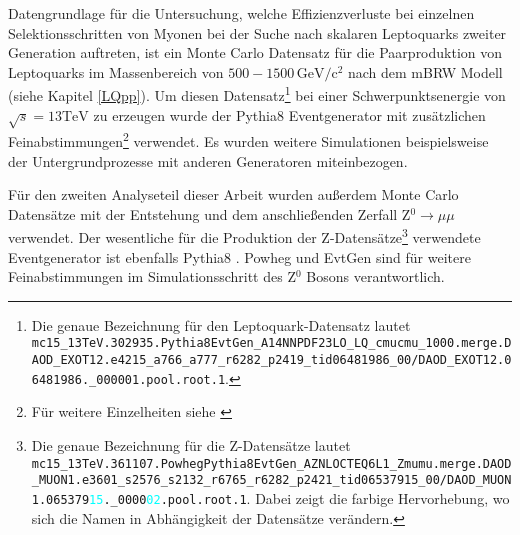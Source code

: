 Datengrundlage für die Untersuchung, welche Effizienzverluste bei einzelnen Selektionsschritten von Myonen bei der Suche nach skalaren Leptoquarks zweiter Generation auftreten, ist ein Monte Carlo Datensatz für die Paarproduktion von Leptoquarks im Massenbereich von $500-1500\,\text{GeV}/\text{c}^2$ nach dem mBRW Modell (siehe Kapitel \ref{LQpp}). Um diesen Datensatz\footnote{Die genaue Bezeichnung für den Leptoquark-Datensatz lautet \nolinkurl{mc15_13TeV.302935.Pythia8EvtGen_A14NNPDF23LO_LQ_cmucmu_1000.merge.DAOD_EXOT12.e4215_a766_a777_r6282_p2419_tid06481986_00/DAOD_EXOT12.06481986._000001.pool.root.1}.} bei einer Schwerpunktsenergie von $\sqrt{s}=13\text{TeV}$ zu erzeugen wurde der Pythia8 Eventgenerator \cite{Pythia8} mit zusätzlichen Feinabstimmungen\footnote{Für weitere Einzelheiten siehe \cite{LQATLAS}} verwendet. Es wurden weitere Simulationen beispielsweise der Untergrundprozesse mit anderen Generatoren miteinbezogen. %

Für den zweiten Analyseteil dieser Arbeit wurden außerdem Monte Carlo Datensätze mit der Entstehung und dem anschließenden  Zerfall Z$^0\rightarrow\mu\mu$ verwendet. Der wesentliche für die Produktion der Z-Datensätze\footnote{Die genaue Bezeichnung für die Z-Datensätze lautet \nolinkurl{mc15_13TeV.361107.PowhegPythia8EvtGen_AZNLOCTEQ6L1_Zmumu.merge.DAOD_MUON1.e3601_s2576_s2132_r6765_r6282_p2421_tid06537915_00/DAOD_MUON1.065379}\texttt{\textcolor{cyan}{15}}\nolinkurl{._0000}\texttt{\textcolor{cyan}{02}}\nolinkurl{.pool.root.1}. Dabei zeigt die farbige Hervorhebung, wo sich die Namen in Abhängigkeit der Datensätze verändern.} verwendete Eventgenerator ist ebenfalls Pythia8 \cite{Pythia8}. Powheg \cite{Powheg} und EvtGen \cite{EvtGen} sind für weitere Feinabstimmungen im Simulationsschritt des Z$^0$ Bosons verantwortlich.
%
%
%
